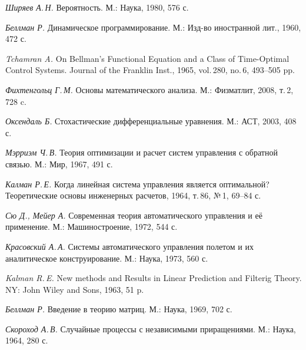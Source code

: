 
\begin{thebibliography}{wlab}


\emph{Ширяев А.\,Н.}
\newblock Вероятность.
\newblock М.: Наука, 1980, 576 с.

\emph{Беллман Р.}
\newblock Динамическое программирование.
\newblock М.: Изд-во иностранной лит., 1960, 472 с.

\emph{Tchamran A.}
\newblock On Bellman's Functional Equation and a Class of Time-Optimal Control Systems.
\newblock Journal of the Franklin Inst., 1965, vol.\,280, no.\,6, 493--505 pp.

\emph{Фихтенгольц Г.\,М.}
\newblock Основы математического анализа.
\newblock М.: Физматлит, 2008, т.\,2, 728 c.

\emph{Оксендаль Б.}
\newblock Стохастические дифференциальные уравнения.
\newblock М.: АСТ, 2003, 408 с.

\emph{Мэрриэм Ч.\,В.}
\newblock Теория оптимизации и расчет систем управления с обратной связью.
\newblock М.: Мир, 1967, 491 с.

\emph{Калман Р.\,Е.}
\newblock Когда линейная система управления является оптимальной?
\newblock Теоретические основы инженерных расчетов, 1964, т.\,86, №\,1, 69--84 с.

\newpage

\emph{Сю Д., Мейер А.}
\newblock Современная теория автоматического управления и её применение.
\newblock М.: Машиностроение, 1972, 544 с.

\emph{Красовский А.\,А.}
\newblock Системы автоматического управления полетом и их аналитическое конструирование.
\newblock М.: Наука, 1973, 560 с.

\emph{Kalman R.\,E.}
\newblock New methods and Results in Linear Prediction and Filterig Theory.
\newblock NY: John Wiley and Sons, 1963, 51 p.

\emph{Беллман Р.}
\newblock Введение в теорию матриц.
\newblock М.: Наука, 1969, 702 с.


\emph{Скороход А.\,В.}
\newblock Случайные процессы с независимыми приращениями.
\newblock М.: Наука, 1964, 280 с.


\end{thebibliography}
